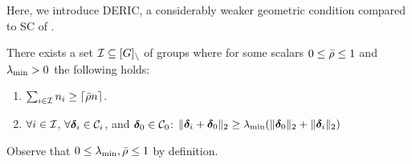 %
%


Here, we introduce DERIC, a considerably weaker geometric condition compared to SC of \cite{guba16, mctr13}. 
\begin{definition}  \label{incodef}
	There exists a set ${\cal I}\subseteq [G]_\setminus$ of groups where for some scalars $0\leq \bar{\rho}\leq 1$ and $\lambda_{\min}>0$ the following holds:
	\begin{enumerate}
		\item $\sum_{i\in {\cal I}} n_i\geq \lceil \bar{\rho} n\rceil$.
		\item $\forall i \in {\cal I}$, $\forall \boldsymbol{\delta}_i \in {\cal C}_i$, and $\boldsymbol{\delta}_0\in{\cal C}_0$: $\|\boldsymbol{\delta}_i+\boldsymbol{\delta}_0\|_{2}\geq \lambda_{\min} (\|\boldsymbol{\delta}_0\|_{2}+\|\boldsymbol{\delta}_i\|_{2})$
	\end{enumerate}
	Observe that $0\leq \lambda_{\min},\bar{\rho}\leq 1$ by definition.
\end{definition}



